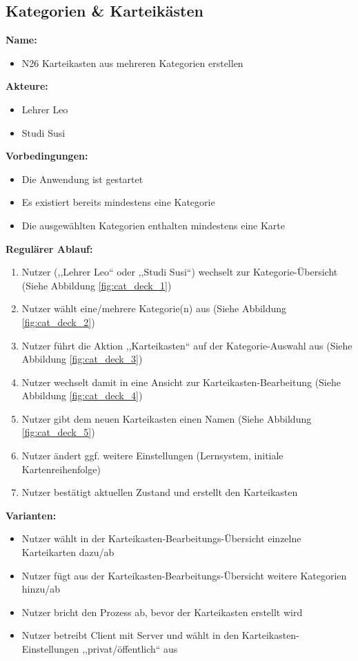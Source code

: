 \documentclass[fontsize=12pt,paper=a4,twoside]{scrartcl}
\begin{document}
\subsection{Kategorien \& Karteikästen}
\textbf{Name:}
\begin{itemize}
	\item N26 Karteikasten aus mehreren Kategorien erstellen
\end{itemize}
\textbf{Akteure:}
\begin{itemize}
	\item Lehrer Leo
	\item Studi Susi
\end{itemize}
\textbf{Vorbedingungen:}
\begin{itemize}
	\item Die Anwendung ist gestartet
	\item Es existiert bereits mindestens eine Kategorie
	\item Die ausgewählten Kategorien enthalten mindestens eine Karte
\end{itemize}
\textbf{Regulärer Ablauf:}
\begin{enumerate}
	\item Nutzer (,,Lehrer Leo`` oder ,,Studi Susi``) wechselt zur Kategorie-Übersicht (Siehe Abbildung \ref{fig:cat_deck_1})
	\item Nutzer wählt eine/mehrere Kategorie(n) aus (Siehe Abbildung \ref{fig:cat_deck_2})
	\item Nutzer führt die Aktion ,,Karteikasten`` auf der Kategorie-Auswahl aus (Siehe Abbildung \ref{fig:cat_deck_3})
	\item Nutzer wechselt damit in eine Ansicht zur Karteikasten-Bearbeitung (Siehe Abbildung \ref{fig:cat_deck_4})
	\item Nutzer gibt dem neuen Karteikasten einen Namen (Siehe Abbildung \ref{fig:cat_deck_5})
	\item Nutzer ändert ggf. weitere Einstellungen (Lernsystem, initiale Kartenreihenfolge)
	\item Nutzer bestätigt aktuellen Zustand und erstellt den Karteikasten
\end{enumerate}
\textbf{Varianten:}
\begin{itemize}
	\item Nutzer wählt in der Karteikasten-Bearbeitungs-Übersicht einzelne Karteikarten dazu/ab
	\item Nutzer fügt aus der Karteikasten-Bearbeitungs-Übersicht weitere Kategorien hinzu/ab
	\item Nutzer bricht den Prozess ab, bevor der Karteikasten erstellt wird
	\item Nutzer betreibt Client mit Server und wählt in den Karteikasten-Einstellungen ,,privat/öffentlich`` aus
\end{itemize}
\end{document}
